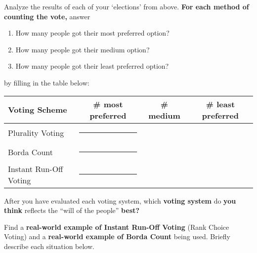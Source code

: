 \documentclass[nooutcomes,noauthor,hints,handout,12pt]{ximera}
\begin{document}
\begin{question}
  Analyze the results of each of your `elections' from above. \textbf{For each
  method of counting the vote,} answer
  \begin{enumerate}
  \item How many people got their most preferred option?
  \item How many people got their medium option? 
  \item How many people got their least preferred option?
  \end{enumerate}
  by filling in the table below:
  \begin{center}\renewcommand{\arraystretch}{1.5}
    \begin{tabular}{|l||c|c|c|}\hline
      Voting Scheme & \# most preferred & \# medium & \# least preferred \\ \hline\hline
      Plurality  Voting &  \rule[7mm]{10mm}{0mm}& & \\ \hline
      Borda Count &  \rule[7mm]{10mm}{0mm}&  & \\ \hline
      Instant Run-Off Voting & \rule[7mm]{10mm}{0mm}&  &\\\hline
    \end{tabular}
  \end{center}
  
  After you have evaluated each voting system, which \textbf{voting system} do
  \textbf{you think} reflects the ``will of the people'' \textbf{best?}
\end{question}
\mynewpage








\begin{question}
  Find a \textbf{real-world example of Instant Run-Off Voting} (Rank Choice Voting) and a
  \textbf{real-world example of Borda Count} being used. Briefly
  describe each situation below.
    
\end{question}
\end{document}

